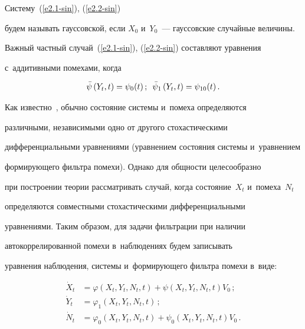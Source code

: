 Систему~(\ref{e2.1-sin}), (\ref{e2.2-sin}) 


будем называть гауссовской, если  $X_0$ и~$Y_0$~--- гауссовские случайные величины.





Важный частный случай~(\ref{e2.1-sin}), (\ref{e2.2-sin}) составляют уравнения 


с~аддитивными помехами, когда


  \begin{equation} 


  \bar\psi\left(Y_t, t\right) = \psi_0 (t)\,;\enskip 


  \bar\psi_1 \left(Y_t, t\right) = \psi_{10} (t)\,.


  \label{e2.3-sin}


  \end{equation}





Как известно~\cite{2-sin}, обычно состояние системы и~помеха определяются


различными, независимыми одно от другого стохастическими


дифференциальными уравнениями (уравнением состояния системы и~уравнением


формирующего фильтра помехи). Однако для общности целесообразно


при построении теории рассматривать случай, когда  состояние~$X_t$ и~помеха~$N_t$


определяются совместными стохастическими дифференциальными


уравнениями. Таким образом, для задачи фильтрации при наличии


автокоррелированной помехи в~наблюдениях будем записывать


уравнения наблюдения, системы и~формирующего фильтра помехи в~виде:


  \begin{align}


  \dot X_t &=\varphi \left(X_t,Y_t,N_t,t\right) + \psi\left(X_t,Y_t,N_t,t\right)V_0\,;


  \label{e2.4-sin}


\\


  \dot Y_t &= \varphi_1 \left(X_t,Y_t,N_t,t\right)\,;


  \label{e2.5-sin}


\\


    \dot N_t &=\varphi_0 \left(X_t,Y_t,N_t,t\right) +\psi_0\left(X_t,Y_t,N_t,t\right)V_0\,.


    \label{e2.6-sin}


    \end{align}


